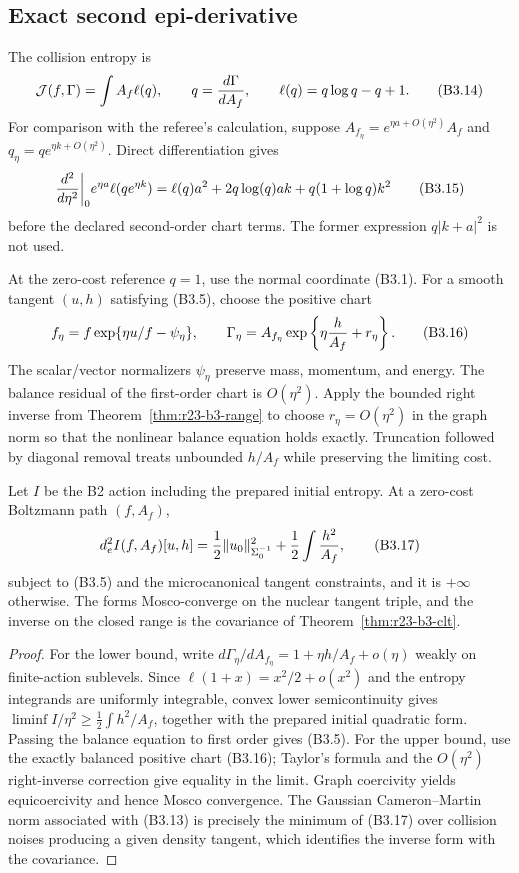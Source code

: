 \subsection{Exact second epi-derivative}

The collision entropy is
\[
 \mathcal J(f,\Gamma)=\int A_f\ell(q),
 \qquad q={d\Gamma\over dA_f},
 \qquad \ell(q)=q\log q-q+1.                             \tag{B3.14}
\]
For comparison with the referee's calculation, suppose
$A_{f_\eta}=e^{\eta a+O(\eta^2)}A_f$ and
$q_\eta=qe^{\eta k+O(\eta^2)}$.  Direct differentiation gives
\[
 {d^2\over d\eta^2}\bigg|_0 e^{\eta a}\ell(qe^{\eta k})
 =\ell(q)a^2+2q\log(q)ak+q(1+\log q)k^2                 \tag{B3.15}
\]
before the declared second-order chart terms.  The former expression
$q|k+a|^2$ is not used.

At the zero-cost reference $q=1$, use the normal coordinate (B3.1).  For a
smooth tangent $(u,h)$ satisfying (B3.5), choose the positive chart
\[
 f_\eta=f\exp\{\eta u/f-\psi_\eta\},
 \qquad
 \Gamma_\eta=A_{f_\eta}
 \exp\left\{\eta {h\over A_f}+r_\eta\right\}.            \tag{B3.16}
\]
The scalar/vector normalizers $\psi_\eta$ preserve mass, momentum, and energy.
The balance residual of the first-order chart is $O(\eta^2)$.  Apply the
bounded right inverse from Theorem~\ref{thm:r23-b3-range} to choose
$r_\eta=O(\eta^2)$ in the graph norm so that the nonlinear balance equation
holds exactly.  Truncation followed by diagonal removal treats unbounded
$h/A_f$ while preserving the limiting cost.

\begin{theorem}
\label{thm:r23-b3-mosco}
Let $I$ be the B2 action including the prepared initial entropy.  At a
zero-cost Boltzmann path $(f,A_f)$,
\[
 d_e^2I(f,A_f)[u,h]
 =\frac12\|u_0\|_{\Sigma_0^{-1}}^2
  +\frac12\int {h^2\over A_f},                           \tag{B3.17}
\]
subject to (B3.5) and the microcanonical tangent constraints, and it is
$+\infty$ otherwise.  The forms Mosco-converge on the nuclear tangent triple,
and the inverse on the closed range is the covariance of
Theorem~\ref{thm:r23-b3-clt}.
\end{theorem}

\begin{proof}
For the lower bound, write
$d\Gamma_\eta/dA_{f_\eta}=1+\eta h/A_f+o(\eta)$ weakly on finite-action
sublevels.  Since
$\ell(1+x)=x^2/2+o(x^2)$ and the entropy integrands are uniformly integrable,
convex lower semicontinuity gives
$\liminf I/\eta^2\ge\frac12\int h^2/A_f$, together with the prepared initial
quadratic form.  Passing the balance equation to first order gives (B3.5).
For the upper bound, use the exactly balanced positive chart (B3.16); Taylor's
formula and the $O(\eta^2)$ right-inverse correction give equality in the
limit.  Graph coercivity yields equicoercivity and hence Mosco convergence.
The Gaussian Cameron--Martin norm associated with (B3.13) is precisely the
minimum of (B3.17) over collision noises producing a given density tangent,
which identifies the inverse form with the covariance.
\end{proof}

